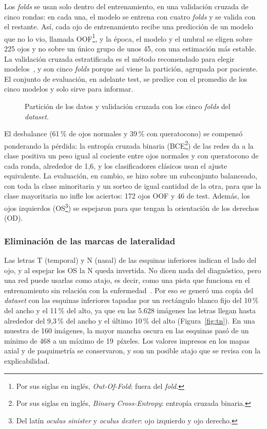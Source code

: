         Los \textit{folds} se usan solo dentro del entrenamiento, en una validación cruzada de cinco rondas: en cada una, el modelo se entrena con cuatro \textit{folds} y se valida con el restante. Así, cada ojo de entrenamiento recibe una predicción de un modelo que no lo vio, llamada OOF\footnote{Por sus siglas en inglés, \textit{Out-Of-Fold}: fuera del \textit{fold}.}, y la época, el modelo y el umbral se eligen sobre 225 ojos y no sobre un único grupo de unos 45, con una estimación más estable. La validación cruzada estratificada es el método recomendado para elegir modelos~\cite{kfold_kohavi}, y son cinco \textit{folds} porque así viene la partición, agrupada por paciente. El conjunto de evaluación, en adelante test, se predice con el promedio de los cinco modelos y solo sirve para informar.

        \begin{figure}[!htbp] \centering
            
            \caption{Partición de los datos y validación cruzada con los cinco \textit{folds} del \textit{dataset}.}
            \label{fig:esquema_particion}
        \end{figure}

        El desbalance (61\,\% de ojos normales y 39\,\% con queratocono) se compensó ponderando la pérdida: la entropía cruzada binaria (BCE\footnote{Por sus siglas en inglés, \textit{Binary Cross-Entropy}: entropía cruzada binaria.}) de las redes da a la clase positiva un peso igual al cociente entre ojos normales y con queratocono de cada ronda, alrededor de 1,6, y los clasificadores clásicos usan el ajuste equivalente. La evaluación, en cambio, se hizo sobre un subconjunto balanceado, con toda la clase minoritaria y un sorteo de igual cantidad de la otra, para que la clase mayoritaria no infle los aciertos: 172 ojos OOF y 46 de test. Además, los ojos izquierdos (OS\footnote{Del latín \textit{oculus sinister} y \textit{oculus dexter}: ojo izquierdo y ojo derecho.}) se espejaron para que tengan la orientación de los derechos (OD).

        \subsubsection*{Eliminación de las marcas de lateralidad}

            Las letras T (temporal) y N (nasal) de las esquinas inferiores indican el lado del ojo, y al espejar los OS la N queda invertida. No dicen nada del diagnóstico, pero una red puede usarlas como atajo, es decir, como una pista que funciona en el entrenamiento sin relación con la enfermedad~\cite{shortcut_learning}. Por eso se generó una copia del \textit{dataset} con las esquinas inferiores tapadas por un rectángulo blanco fijo del 10\,\% del ancho y el 11\,\% del alto, ya que en las 5.628 imágenes las letras llegan hasta alrededor del 9,3\,\% del ancho y el último 10\,\% del alto (Figura~\ref{fig:tn}). En una muestra de 160 imágenes, la mayor mancha oscura en las esquinas pasó de un mínimo de 468 a un máximo de 19~píxeles. Los valores impresos en los mapas axial y de paquimetría se conservaron, y son un posible atajo que se revisa con la explicabilidad.

